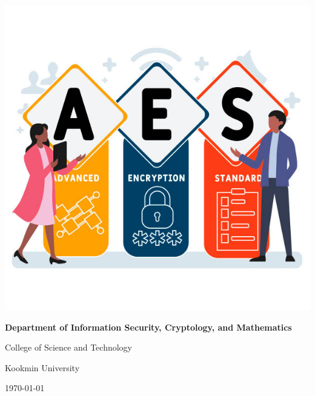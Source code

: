 \documentclass[12pt,openany]{book}
\begin{document}
\begin{titlepage}
\begin{center}
			\includegraphics[scale=2]{images/title.jpg}\par
			\vspace{1in}
			{\large\bf \textsf{Department of Information Security, Cryptology, and Mathematics}\par}
			{\textsf{College of Science and Technology}\par}
			{\textsf{Kookmin University}\par}
			\vspace{.25in}
			{\large \textsf{\today}\par}
		\end{center}
	\end{titlepage}
	
	\frontmatter
%	
%	
	
	\newpage
	\tableofcontents
	
	\newpage
	\mainmatter
	
%	
	
	\appendix
	
%	
	
	\backmatter
	
\end{document}
